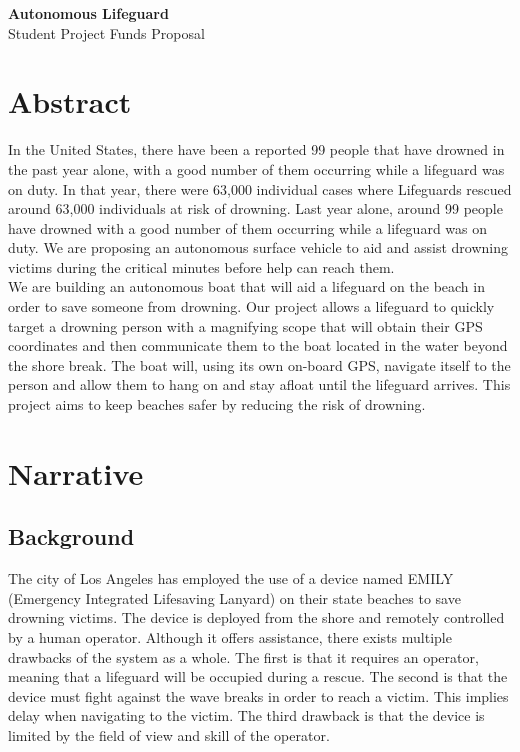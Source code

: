 \documentclass[11pt]{article}
\begin{document}
\begin{center} 
{
    {\Large \textbf{Autonomous Lifeguard}}\\
  	{\large Student Project Funds Proposal}
}
\end{center}

\section*{Abstract}
In the United States, there have been a reported 99 people that have drowned in the past year alone, with a good number of them occurring while a lifeguard was on duty. In that year, there were 63,000 individual cases where Lifeguards rescued around 63,000 individuals at risk of drowning. Last year alone, around 99 people have drowned with a good number of them occurring while a lifeguard was on duty. We are proposing an autonomous surface vehicle to aid and assist drowning victims during the critical minutes before help can reach them.\\


We are building an autonomous boat that will aid a lifeguard on the beach in order to save someone from drowning. Our project allows a lifeguard to quickly target a drowning person with a magnifying scope that will obtain their GPS coordinates and then communicate them to the boat located in the water beyond the shore break. The boat will, using its own on-board GPS, navigate itself to the person and allow them to hang on and stay afloat until the lifeguard arrives. This project aims to keep beaches safer by reducing the risk of drowning. 


\section*{Narrative}

\subsection*{Background}

The city of Los Angeles has employed the use of a device named EMILY (Emergency Integrated Lifesaving Lanyard) on their state beaches to save drowning victims. The device is deployed from the shore and remotely controlled by a human operator. Although it offers assistance, there exists multiple drawbacks of the system as a whole. The first is that it requires an operator, meaning that a lifeguard will be occupied during a rescue. The second is that the device must fight against the wave breaks in order to reach a victim. This implies delay when navigating to the victim. The third drawback is that the device is limited by the field of view and skill of the operator.\\
\end{document}
